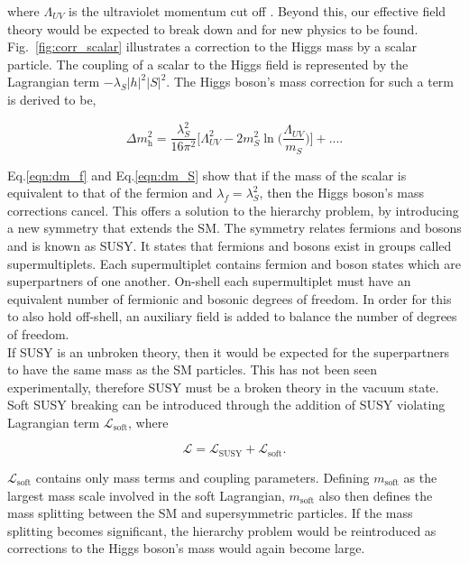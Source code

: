 where \(\Lambda_{UV}\) is the ultraviolet momentum cut off \cite{SUSY_Primer}.
Beyond this, our effective field theory would be expected to break down and for new physics to be found. \\

Fig.~\ref{fig:corr_scalar} illustrates a correction to the Higgs mass by a scalar particle. 
The coupling of a scalar to the Higgs field is represented by the Lagrangian term $-\lambda_S |h|^2 |S|^2$. 
The Higgs boson's mass correction for such a term is derived to be,

\begin{equation}
    \Delta m_{\text{h}}^{2} =  \frac{\lambda_{S}^{2}}{16\pi^2}\Big[\Lambda_{UV}^{2} -2m_{S}^{2} \ln\Big(\frac{\Lambda_{UV}}{m_S}\Big) \Big] + ... .
    \label{eqn:dm_S}
\end{equation}

Eq.\ref{eqn:dm_f} and Eq.\ref{eqn:dm_S} show that if the mass of the scalar is equivalent to that of the fermion and $\lambda_f = \lambda_{S}^{2}$, then the Higgs boson's mass corrections cancel. 
This offers a solution to the hierarchy problem, by introducing a new symmetry that extends the \ac{SM}. 
The symmetry relates fermions and bosons and is known as \ac{SUSY}. 
It states that fermions and bosons exist in groups called supermultiplets. 
Each supermultiplet contains fermion and boson states which are superpartners of one another. 
On-shell each supermultiplet must have an equivalent number of fermionic and bosonic degrees of freedom. 
In order for this to also hold off-shell, an auxiliary field is added to balance the number of degrees of freedom. \\

If \ac{SUSY} is an unbroken theory, then it would be expected for the superpartners to have the same mass as the \ac{SM} particles. 
This has not been seen experimentally, therefore \ac{SUSY} must be a broken theory in the vacuum state. 
Soft \ac{SUSY} breaking can be introduced through the addition of \ac{SUSY} violating Lagrangian term $\mathcal{L}_{\text{soft}}$, where

\begin{equation}
    \mathcal{L} = \mathcal{L}_{\text{SUSY}} + \mathcal{L}_{\text{soft}}.
\end{equation}

$\mathcal{L}_{\text{soft}}$ contains only mass terms and coupling parameters. 
Defining $m_{\text{soft}}$ as the largest mass scale involved in the soft Lagrangian, $m_{\text{soft}}$ also then defines the mass splitting between the \ac{SM} and supersymmetric particles. 
If the mass splitting becomes significant, the hierarchy problem would be reintroduced as corrections to the Higgs boson's mass would again become large. \\

